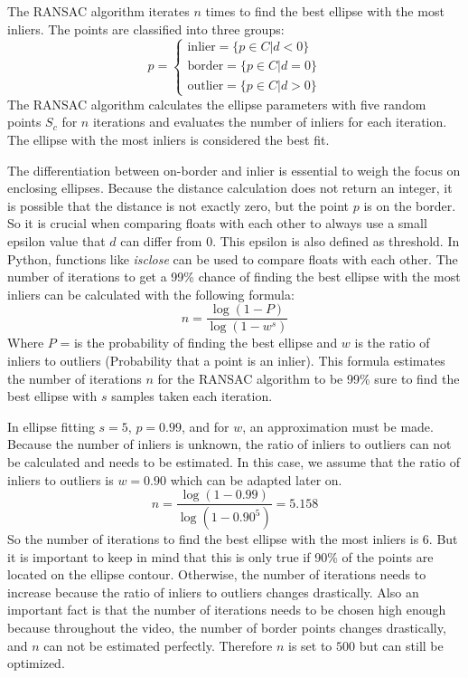 The RANSAC algorithm iterates $n$ times to find the best ellipse with the most inliers. The points are classified into three groups: 
\begin{equation}
    p =\begin{cases}
    \text{inlier} = \{p \in C | d < 0\}\\
    \text{border} = \{p \in C | d = 0\}\\
    \text{outlier} = \{p \in C | d > 0\}
    \end{cases}
    \label{inliers}
\end{equation}
The RANSAC algorithm calculates the ellipse parameters with five random points $S_c$ for $n$ iterations and evaluates the number of inliers for each iteration. The ellipse with the most inliers is considered the best fit. 

The differentiation between on-border and inlier is essential to weigh the focus on enclosing ellipses. Because the distance calculation does not return an integer, it is possible that the distance is not exactly zero, but the point $p$ is on the border. So it is crucial when comparing floats with each other to always use a small epsilon value that $d$ can differ from 0. This epsilon is also defined as threshold. 
In Python, functions like \textit{isclose} can be used to compare floats with each other. The number of iterations to get a 99\% chance of finding the best ellipse with the most inliers can be calculated with the following formula: 
\begin{equation}
    n = \frac{\log(1-P)}{\log(1-w^s)}
    \label{iterations}
\end{equation}
Where $P$ = is the probability of finding the best ellipse and $w$ is the ratio of inliers to outliers (Probability that a point is an inlier). This formula estimates the number of iterations $n$ for the RANSAC algorithm to be 99\% sure to find the best ellipse with $s$ samples taken each iteration. 

In ellipse fitting $s=5$, $p=0.99$, and for $w$, an approximation must be made. Because the number of inliers is unknown, the ratio of inliers to outliers can not be calculated and needs to be estimated. In this case, we assume that the ratio of inliers to outliers is $w=0.90$ which can be adapted later on. 
\begin{equation}
    n = \frac{\log(1-0.99)}{\log(1-0.90^5)} =  5.158
\end{equation}
So the number of iterations to find the best ellipse with the most inliers is 6. But it is important to keep in mind that this is only true if 90\% of the points are located on the ellipse contour. Otherwise, the number of iterations needs to increase because the ratio of inliers to outliers changes drastically. Also an important fact is that the number of iterations needs to be chosen high enough because throughout the video, the number of border points changes drastically, and $n$ can not be estimated perfectly. Therefore $n$ is set to $500$ but can still be optimized.

